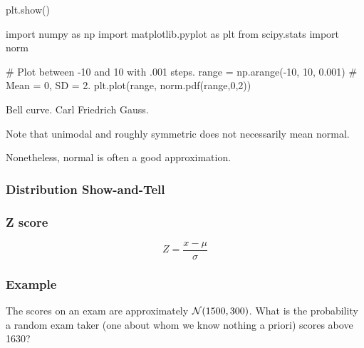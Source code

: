 \begin{frame}
{    plt.show()

    
    
    import numpy as np
    import matplotlib.pyplot as plt
    from scipy.stats import norm
    
    \# Plot between -10 and 10 with .001 steps.
    range = np.arange(-10, 10, 0.001)
    \# Mean = 0, SD = 2.
    plt.plot(range, norm.pdf(range,0,2))

    \bigskip

    Bell curve.  Carl Friedrich Gauss.
    
    Note that unimodal and roughly symmetric does not necessarily mean normal.
    
    Nonetheless, normal is often a good approximation.

  }
  
\end{frame}

\begin{frame}
  \frametitle{Distribution Show-and-Tell}

\end{frame}

\begin{frame}
  \frametitle{Z score}

  \vspace{1cm}
  
  \begin{displaymath}
    Z = \frac{x-\mu}{\sigma}
  \end{displaymath}
  
\end{frame}

\begin{frame}
  \frametitle{Example}

  The scores on an exam are approximately $\mathcal{N}(1500, 300)$.  What is
  the probability a random exam taker (one about whom we know nothing
  a priori) scores above 1630?

  
  
\end{frame}

